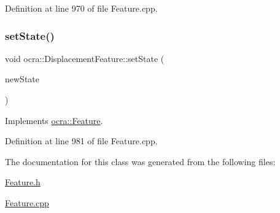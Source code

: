 Definition at line 970 of file Feature.\+cpp.

\hypertarget{classocra_1_1DisplacementFeature_a7a99c7e57d512ec2d6094fc10388e033}{}\label{classocra_1_1DisplacementFeature_a7a99c7e57d512ec2d6094fc10388e033} 
\subsubsection{\texorpdfstring{set\+State()}{setState()}}
{\footnotesize\ttfamily void ocra\+::\+Displacement\+Feature\+::set\+State (\begin{DoxyParamCaption}\item[{const \hyperlink{classocra_1_1TaskState}{Task\+State} \&}]{new\+State }\end{DoxyParamCaption})\hspace{0.3cm}{\ttfamily [virtual]}}



Implements \hyperlink{classocra_1_1Feature_ad16d6b176b229280649ab405531e9a30}{ocra\+::\+Feature}.



Definition at line 981 of file Feature.\+cpp.



The documentation for this class was generated from the following files\+:\begin{DoxyCompactItemize}
\item 
\hyperlink{Feature_8h}{Feature.\+h}\item 
\hyperlink{Feature_8cpp}{Feature.\+cpp}\end{DoxyCompactItemize}
